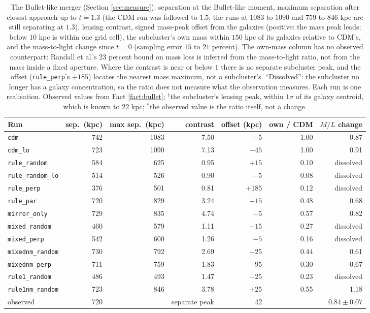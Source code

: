 \documentclass[11pt]{article}
\theoremstyle{definition}
\begin{document}
\begin{table}[htbp]\centering\small\setlength{\tabcolsep}{4pt}
\begin{tabular}{@{}lrrrrrr@{}}
\toprule
Run & sep.\ (kpc) & max sep.\ (kpc) & contrast & offset (kpc) & own / CDM & $M/L$ change \\
\midrule
\texttt{cdm} & 742 & 1083 & 7.50 & $-5$ & 1.00 & 0.87 \\
\texttt{cdm\_lo} & 723 & 1090 & 7.13 & $-45$ & 1.00 & 0.91 \\
\texttt{rule\_random} & 584 & 625 & 0.95 & $+15$ & 0.10 & dissolved \\
\texttt{rule\_random\_lo} & 514 & 526 & 0.90 & $-5$ & 0.08 & dissolved \\
\texttt{rule\_perp} & 376 & 501 & 0.81 & $+185$ & 0.12 & dissolved \\
\texttt{rule\_par} & 720 & 829 & 3.24 & $-15$ & 0.48 & 0.68 \\
\texttt{mirror\_only} & 729 & 835 & 4.74 & $-5$ & 0.57 & 0.82 \\
\texttt{mixed\_random} & 460 & 579 & 1.11 & $-15$ & 0.27 & dissolved \\
\texttt{mixed\_perp} & 542 & 600 & 1.26 & $-5$ & 0.16 & dissolved \\
\texttt{mixednm\_random} & 730 & 792 & 2.69 & $-25$ & 0.44 & 0.61 \\
\texttt{mixednm\_perp} & 711 & 759 & 1.83 & $-95$ & 0.30 & 0.67 \\
\texttt{rule1\_random} & 486 & 493 & 1.47 & $-25$ & 0.23 & dissolved \\
\texttt{rule1nm\_random} & 723 & 846 & 3.78 & $+25$ & 0.55 & 1.18 \\
\midrule
observed & 720 & & separate peak & 42\rlap{$^{\dagger}$} & & $0.84 \pm 0.07$\rlap{$^{*}$} \\
\bottomrule
\end{tabular}
\caption{The Bullet-like merger (Section \ref{sec:measure}): separation at the Bullet-like moment, maximum separation after closest approach up to $t = 1.3$ (the CDM run was followed to $1.5$; the runs at $1083$ to $1090$ and $759$ to $846$ kpc are still separating at $1.3$), lensing contrast, signed mass-peak offset from the galaxies (positive: the mass peak leads; below $10$ kpc is within one grid cell), the subcluster's own mass within $150$ kpc of its galaxies relative to CDM's, and the mass-to-light change since $t = 0$ (sampling error $15$ to $21$ percent). The own-mass column has no observed counterpart: Randall et al.'s $23$ percent bound on mass loss is inferred from the mass-to-light ratio, not from the mass inside a fixed aperture. Where the contrast is near or below $1$ there is no separate subcluster peak, and the offset (\texttt{rule\_perp}'s $+185$) locates the nearest mass maximum, not a subcluster's. ``Dissolved'': the subcluster no longer has a galaxy concentration, so the ratio does not measure what the observation measures. Each run is one realisation. Observed values from Fact \ref{fact:bullet}; $^{\dagger}$the subcluster's lensing peak, within $1\sigma$ of its galaxy centroid, which is known to $22$ kpc; $^{*}$the observed value is the ratio itself, not a change.}
\label{tab:merger}
\end{table}
\end{document}
